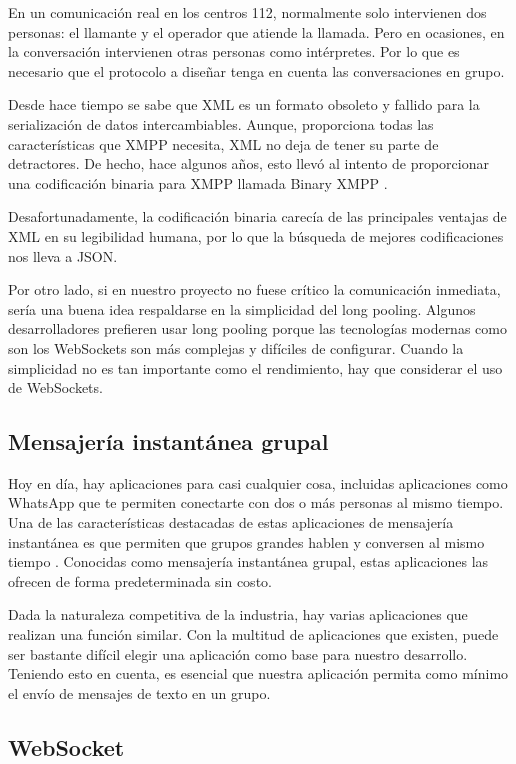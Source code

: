 En un comunicación real en los centros 112, normalmente solo intervienen dos personas: el llamante y el operador que atiende la llamada. Pero en ocasiones, en la conversación intervienen otras personas como intérpretes. Por lo que es necesario que el protocolo a diseñar tenga en cuenta las conversaciones en grupo.

Desde hace tiempo se sabe que XML es un formato obsoleto y fallido para la serialización de datos intercambiables. Aunque, proporciona todas las características que XMPP necesita, XML no deja de tener su parte de detractores. De hecho, hace algunos años, esto llevó al intento de proporcionar una codificación binaria para XMPP llamada Binary XMPP \cite{protocoloim3}.

Desafortunadamente, la codificación binaria carecía de las principales ventajas de XML en su legibilidad humana, por lo que la búsqueda de mejores codificaciones nos lleva a JSON.

Por otro lado, si en nuestro proyecto no fuese crítico la comunicación inmediata, sería una buena idea respaldarse en la simplicidad del long pooling. Algunos desarrolladores prefieren usar long pooling porque las tecnologías modernas como son los WebSockets son más complejas y difíciles de configurar. Cuando la simplicidad no es tan importante como el rendimiento, hay que considerar el uso de WebSockets.

\subsection{Mensajería instantánea grupal}

Hoy en día, hay aplicaciones para casi cualquier cosa, incluidas aplicaciones como WhatsApp que te permiten conectarte con dos o más personas al mismo tiempo. Una de las características destacadas de estas aplicaciones de mensajería instantánea es que permiten que grupos grandes hablen y conversen al mismo tiempo \cite{im10}. Conocidas como mensajería instantánea grupal, estas aplicaciones las ofrecen de forma predeterminada sin costo.

Dada la naturaleza competitiva de la industria, hay varias aplicaciones que realizan una función similar. Con la multitud de aplicaciones que existen, puede ser bastante difícil elegir una aplicación como base para nuestro desarrollo. Teniendo esto en cuenta, es esencial que nuestra aplicación permita como mínimo el envío de mensajes de texto en un grupo.

\subsection{WebSocket}


